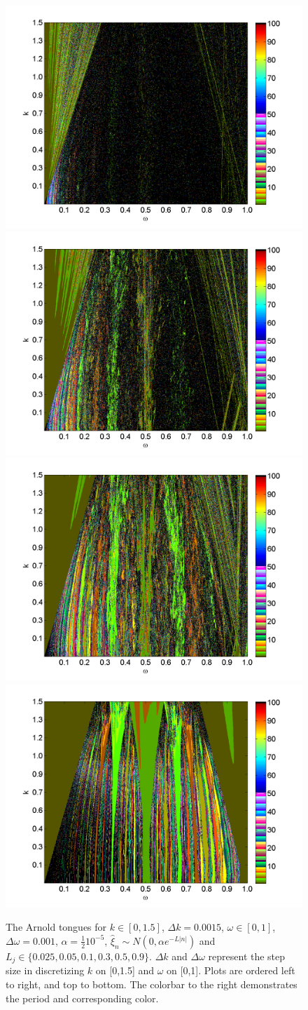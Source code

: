 \begin{figure}[H]\linespread{1}  
\caption[The Arnold tongues for the random circle map, normal
distribution, $\alpha = \frac{1}{2}10^{-5}$]{The Arnold
  tongues for $k\in [0,1.5]$, $\Delta k = 0.0015$, $\omega \in [0,1]$,
  $\Delta \omega = 0.001$, $\alpha = \frac{1}{2}10^{-5}$, $\hat{\xi}_n\sim
  N(0,\alpha e^{-L|n|})$ and $L_j \in
  \{0.025,0.05,0.1,0.3,0.5,0.9\}$. $\Delta k$ and $\Delta \omega$
  represent the step size in discretizing $k$ on [0,1.5] and $\omega$
  on [0,1]. Plots are ordered left to right, and top to bottom. The colorbar
to the right demonstrates the period and corresponding color.}\label{fig:rcirctongues_n_ha}
\centering
\includegraphics[width=.5\textwidth]{figs/tongues_norm_halfa_1000_L_0025.png}\hfill
\includegraphics[width=.5\textwidth]{figs/tongues_norm_halfa_1000_L_005.png}\\
\includegraphics[width=.5\textwidth]{figs/tongues_norm_halfa_1000_L_01.png}\hfill
\includegraphics[width=.5\textwidth]{figs/tongues_norm_halfa_1000_L_03.png}\\

\end{figure}
